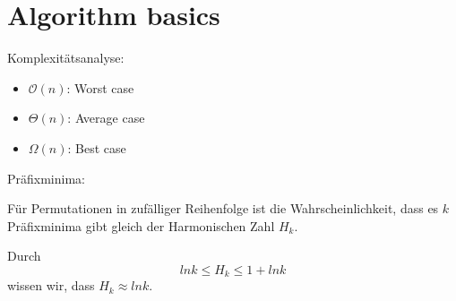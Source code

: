 \chapter{Algorithm basics}

Komplexitätsanalyse:
\begin{itemize}
  \item \textbf{$\mathcal{O}(n)$}: Worst case
  \item \textbf{$\Theta (n)$}: Average case
  \item \textbf{$\Omega (n)$}: Best case
\end{itemize}

Präfixminima:

Für Permutationen in zufälliger Reihenfolge ist die Wahrscheinlichkeit, dass es $k$ Präfixminima gibt gleich der Harmonischen Zahl $H_k$.

Durch
\begin{equation*}
  ln k \leq H_k \leq 1+ ln k
\end{equation*} 
wissen wir, dass $H_k\approx ln k$.


